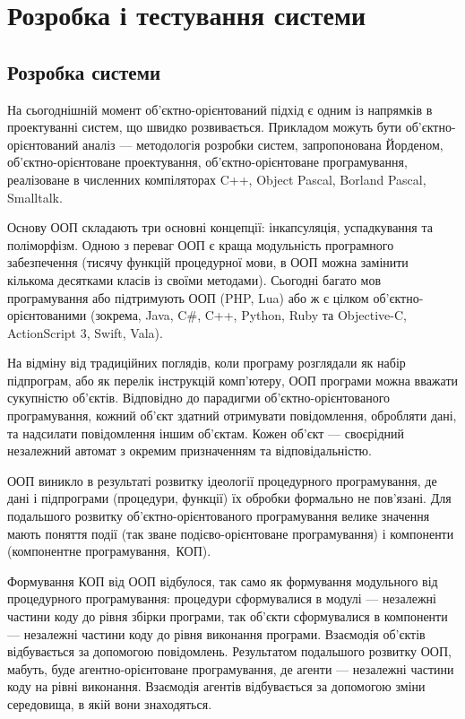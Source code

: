 \documentclass[../main.tex]{subfiles}
\begin{document}
\chapter{Розробка і тестування системи}

\section{Розробка системи}

На сьогоднішній момент об'єктно-\linebreak[0]орієнтований підхід є одним із напрямків в проектуванні систем, що швидко розвивається. Прикладом можуть бути об'єктно-\linebreak[0]орієнтований аналіз — методологія розробки систем, запропонована Йорденом, об'єктно-орієнтоване проектування, об'єктно-\linebreak[0]орієнтоване програмування, реалізоване в численних компіляторах C++, Object Pascal, Borland Pascal, Smalltalk.

Основу ООП складають три основні концепції: інкапсуляція, успадкування та поліморфізм. Одною з переваг ООП є краща модульність програмного забезпечення (тисячу функцій процедурної мови, в ООП можна замінити кількома десятками класів із своїми методами). Сьогодні багато мов програмування або підтримують ООП (PHP, Lua) або ж є цілком об'єктно-орієнтованими (зокрема, Java, C\#, C++, Python, Ruby та Objective-C, ActionScript 3, Swift, Vala).~\cite{oo_thought_process}

На відміну від традиційних поглядів, коли програму розглядали як набір підпрограм, або як перелік інструкцій комп'ютеру, ООП програми можна вважати сукупністю об'єктів. Відповідно до парадигми об'єктно-\linebreak[0]орієнтованого програмування, кожний об'єкт здатний отримувати повідомлення, обробляти дані, та надсилати повідомлення іншим об'єктам. Кожен об'єкт — своєрідний незалежний автомат з окремим призначенням та відповідальністю.~\cite{object_oriented_analysis}

ООП виникло в результаті розвитку ідеології процедурного програмування, де дані і підпрограми (процедури, функції) їх обробки формально не пов'язані. Для подальшого розвитку об'єктно-орієнтованого програмування велике значення мають поняття події (так зване подієво-орієнтоване програмування) і компоненти (компонентне програмування,~КОП).~\cite{oo_methods}

Формування КОП від ООП відбулося, так само як формування модульного від процедурного програмування: процедури сформувалися в модулі — незалежні частини коду до рівня збірки програми, так об'єкти сформувалися в компоненти — незалежні частини коду до рівня виконання програми. Взаємодія об'єктів відбувається за допомогою повідомлень. Результатом подальшого розвитку ООП, мабуть, буде агентно-орієнтоване програмування, де агенти — незалежні частини коду на рівні виконання. Взаємодія агентів відбувається за допомогою зміни середовища, в якій вони знаходяться.
\end{document}
